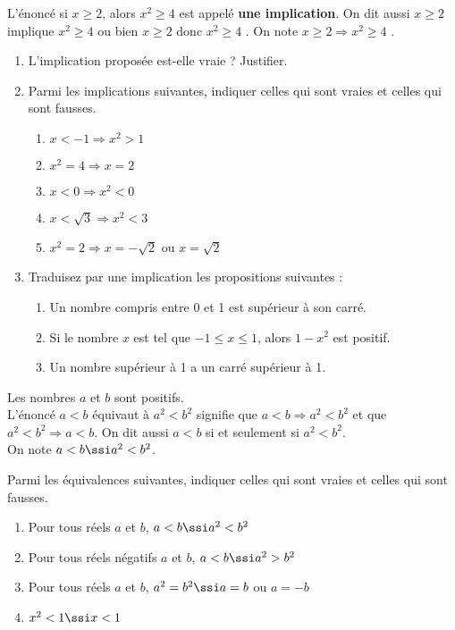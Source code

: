 \begin{exo}
 L'\'enonc\'e \og si $x \geqslant 2$, alors $x^2\geqslant 4$ \fg{} est appel\'e \textbf{une implication}. On dit aussi \og $x \geqslant 2$ implique $x^2\geqslant 4$ \fg{} ou bien \og $x \geqslant 2$ donc $x^2\geqslant 4$ \fg{}.
 On note \og $x \geqslant 2 \Rightarrow x^2\geqslant 4$ \fg.
\begin{enumerate}
 \item L'implication propos\'ee est-elle vraie ? Justifier.
 \item Parmi les implications suivantes, indiquer celles qui sont vraies et celles qui sont fausses.
       \vspace{-1em}\begin{multicols}{2}\begin{enumerate}
        \item $x < -1 \Rightarrow x^2>1$
	\item $x^2=4 \Rightarrow x=2$
	\item $x <0 \Rightarrow x^2<0$
	\item $x <\sqrt{3} \Rightarrow x^2<3$
	\item $x^2 = 2 \Rightarrow x=-\sqrt{2}$ ou $x=\sqrt{2}$
       \end{enumerate}\end{multicols}\vspace{-1em}
 \item Traduisez par une implication les propositions suivantes :
	\begin{enumerate}
	 \item Un nombre compris entre 0 et 1 est sup\'erieur \`a son carr\'e.
	 \item Si le nombre $x$ est tel que $-1\leqslant x \leqslant 1$, alors $1-x^2$ est positif.
	 \item Un nombre sup\'erieur \`a 1 a un carr\'e sup\'erieur \`a 1.
	\end{enumerate}

\end{enumerate}
\end{exo}

\begin{exo}
 Les nombres $a$ et $b$ sont positifs.\\
 L'\'enonc\'e \og $a<b$ \'equivaut \`a $a^2<b^2$ \fg{} signifie que $a<b \Rightarrow a^2<b^2$ et que $a^2<b^2 \Rightarrow a<b$. On dit aussi \og $a<b$ si et seulement si $a^2<b^2$.\\
 On note $a<b \ssi a^2<b^2$.


Parmi les \'equivalences suivantes, indiquer celles qui sont vraies et celles qui sont fausses.
      \begin{enumerate}
       \item Pour tous r\'eels $a$ et $b$, $a<b\ssi a^2<b^2$
       \item Pour tous r\'eels n\'egatifs $a$ et $b$, $a<b \ssi a^2>b^2$
       \item Pour tous r\'eels $a$ et $b$, $a^2=b^2 \ssi a=b$ ou $a=-b$
       \item $x^2<1 \ssi x<1$
      \end{enumerate}

\end{exo}

